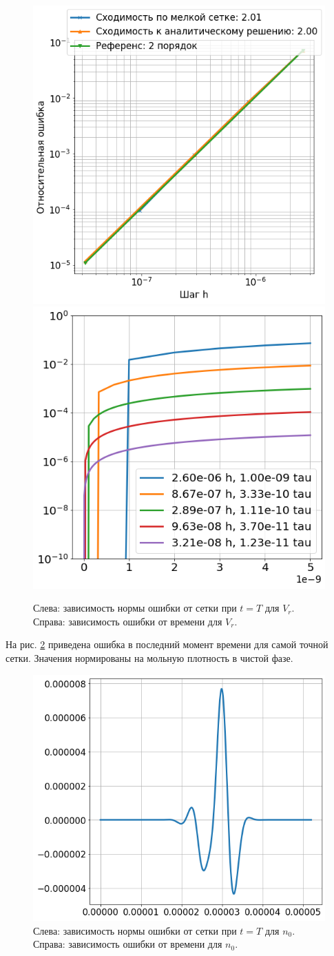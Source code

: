 \begin{figure}[H]
\centering
\includegraphics[width=.5\textwidth]{dhd_convergence/convergence_v.png}\hfill
\includegraphics[width=.5\textwidth]{dhd_convergence/time_error_v.png}
\caption{Слева: зависимость нормы ошибки от сетки при $t = T$ для $V_r$. Справа: зависимость ошибки от времени для $V_r$.}
\label{fig:dhd_convergence_v}
\end{figure}

На рис. \ref{fig:dhd_convergence_error} приведена ошибка в последний момент времени для самой точной сетки. Значения нормированы на мольную плотность в чистой фазе.
\begin{figure}[H]
\centering
\includegraphics[width=.5\textwidth]{dhd_convergence/rel_err_n0.png}\hfill
\caption{Слева: зависимость нормы ошибки от сетки при $t = T$ для $n_0$. Справа: зависимость ошибки от времени для $n_0$.}
\label{fig:dhd_convergence_error}
\end{figure}
